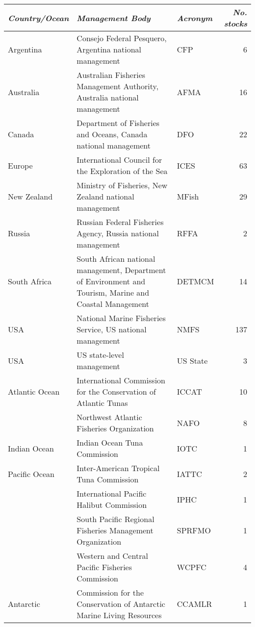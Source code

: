 \begin{tabular}{l | l | l | r}
\textit{Country/Ocean} & \textit{Management Body} & \textit{Acronym} & \textit{No. stocks} \\
\hline
Argentina & Consejo Federal Pesquero, Argentina national management & CFP & 6 \\
Australia & Australian Fisheries Management Authority, Australia national management & AFMA & 16 \\
Canada & Department of Fisheries and Oceans, Canada national management & DFO & 22 \\
Europe & International Council for the Exploration of the Sea & ICES & 63 \\
New Zealand & Ministry of Fisheries, New Zealand national management & MFish & 29 \\
Russia & Russian Federal Fisheries Agency, Russia national management & RFFA & 2 \\
South Africa & South African national management, Department of Environment and Tourism, Marine and Coastal Management & DETMCM & 14 \\
USA & National Marine Fisheries Service, US national management & NMFS & 137 \\
USA & US state-level management & US State & 3 \\
Atlantic Ocean & International Commission for the Conservation of Atlantic Tunas & ICCAT & 10 \\
 & Northwest Atlantic Fisheries Organization & NAFO & 8 \\
Indian Ocean & Indian Ocean Tuna Commission & IOTC & 1 \\
Pacific Ocean & Inter-American Tropical Tuna Commission & IATTC & 2 \\
 & International Pacific Halibut Commission & IPHC & 1 \\
 & South Pacific Regional Fisheries Management Organization & SPRFMO & 1 \\
 & Western and Central Pacific Fisheries Commission & WCPFC & 4 \\
Antarctic & Commission for the Conservation of Antarctic Marine Living Resources & CCAMLR & 1 \\
\end{tabular}

